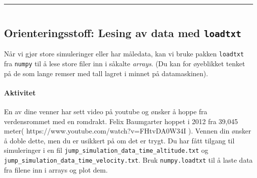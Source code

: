\documentclass[11pt]{article}
\makeatletter
\newcommand{\boxspacing}{\kern\kvtcb@left@rule\kern\kvtcb@boxsep}
\newcommand{\prompt}[4]{
        \ttfamily\llap{{\color{#2}[#3]:\hspace{3pt}#4}}\vspace{-\baselineskip}
    }
\makeatother
\begin{document}
    \begin{center}
    \end{center}
    { \hspace*{\fill} \\}
    
    \begin{center}\rule{0.5\linewidth}{\linethickness}\end{center}

    \begin{tcolorbox}[breakable, size=fbox, boxrule=1pt, pad at break*=1mm,colback=cellbackground, colframe=cellborder]
\prompt{In}{incolor}{ }{\boxspacing}
\begin{Verbatim}[commandchars=\\\{\}]

\end{Verbatim}
\end{tcolorbox}

    \hypertarget{orienteringsstoff-lesing-av-data-med-loadtxt}{%
\subsection{\texorpdfstring{Orienteringsstoff: Lesing av data med
\texttt{loadtxt}}{Orienteringsstoff: Lesing av data med loadtxt}}\label{orienteringsstoff-lesing-av-data-med-loadtxt}}

    Når vi gjør store simuleringer eller har måledata, kan vi bruke pakken
\texttt{loadtxt} fra \texttt{numpy} til å lese store filer inn i såkalte
\emph{arrays}. (Du kan for øyeblikket tenket på de som lange remser med
tall lagret i minnet på datamaskinen).

\hypertarget{aktivitet}{%
\paragraph{Aktivitet}\label{aktivitet}}

En av dine venner har sett video på youtube og ønsker å hoppe fra
verdensrommet med en romdrakt. Felix Baumgarter hoppet i 2012 fra 39,045
meter( https://www.youtube.com/watch?v=FHtvDA0W34I ). Vennen din ønsker
å doble dette, men du er usikkert på om det er trygt. Du har fått
tilgang til simuleringer i en fil
\texttt{jump\_simulation\_data\_time\_altitude.txt} og
\texttt{jump\_simulation\_data\_time\_velocity.txt}. Bruk
\texttt{numpy.loadtxt} til å laste data fra filene inn i arrays og plot
dem.
\end{document}
